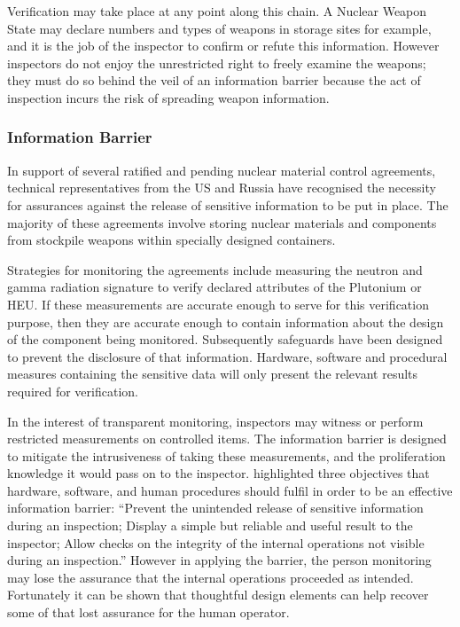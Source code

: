 \documentclass[twoside,titlepage,11pt,twocolumn,a4paper]{article}
\begin{document}
Verification may take place at any point along this chain. A Nuclear
Weapon State may declare numbers and types of weapons in storage sites
for example, and it is the job of the inspector to confirm or refute
this information.  However inspectors do not enjoy the unrestricted
right to freely examine the weapons; they must do so behind the veil
of an information barrier because the act of inspection incurs the
risk of spreading weapon information.

\subsubsection{Information Barrier}
In support of several ratified and pending nuclear material control
agreements, technical representatives from the US and Russia have
recognised the necessity for assurances against the release of
sensitive information to be put in place.  The majority of these
agreements involve storing nuclear materials and components from
stockpile weapons within specially designed containers.

Strategies for monitoring the agreements include measuring the neutron
and gamma radiation signature to verify declared attributes of the
Plutonium or HEU.  If these measurements are accurate enough to serve
for this verification purpose, then they are accurate enough to
contain information about the design of the component being
monitored. Subsequently safeguards have been designed to prevent the
disclosure of that information. Hardware, software and procedural
measures containing the sensitive data will only present the relevant
results required for verification. \citep{wolford2000} 

In the interest of transparent monitoring, inspectors may witness or
perform restricted measurements on controlled items. The information
barrier is designed to mitigate the intrusiveness of taking these
measurements, and the proliferation knowledge it would pass on to the
inspector. \citet{wolford2000}
highlighted three objectives that hardware, software, and human
procedures should fulfil in order to be an effective information
barrier: ``Prevent the unintended release of sensitive information
during an inspection; Display a simple but reliable and useful result
to the inspector; Allow checks on the integrity of the internal
operations not visible during an inspection.''  However in applying
the barrier, the person monitoring may lose the assurance that the
internal operations proceeded as intended. Fortunately it can be shown
that thoughtful design elements can help recover some of that lost
assurance for the human operator.
\end{document}
